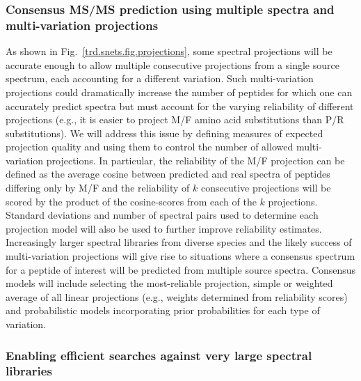 \documentclass[arial,11pt]{article}
\begin{document}
\subsubsection{Consensus MS/MS prediction using multiple spectra and multi-variation projections}\label{trd.snets.aim.sp.consensus}

As shown in Fig.~\ref{trd.snets.fig.projections}, some spectral projections will be accurate enough to allow multiple consecutive projections from a single source spectrum, each accounting for a different variation. Such multi-variation projections could dramatically increase the number of peptides for which one can accurately predict spectra but must account for the varying reliability of different projections (e.g., it is easier to project M/F amino acid substitutions than P/R substitutions). We will address this issue by defining measures of expected projection quality and using them to control the number of allowed multi-variation projections. In particular, the reliability of the M/F projection can be defined as the average cosine between predicted and real spectra of peptides differing only by M/F and the reliability of $k$ consecutive projections will be scored by the product of the cosine-scores from each of the $k$ projections. Standard deviations and number of spectral pairs used to determine each projection model will also be used to further improve reliability estimates.
%
Increasingly larger spectral libraries from diverse species and the likely success of multi-variation projections will give rise to situations where a consensus spectrum for a peptide of interest will be predicted from multiple source spectra. Consensus models will include selecting the most-reliable projection, simple or weighted average of all linear projections (e.g., weights determined from reliability scores) and probabilistic models incorporating prior probabilities for each type of variation. %

\subsubsection{Enabling efficient searches against very large spectral libraries}\label{trd.snets.aim.id.tags}
\end{document}
